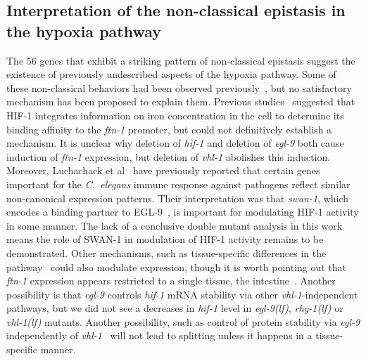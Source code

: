 \documentclass[9pt,twocolumn,twoside]{pnas-new}
\newcommand{\cel}{\emph{C.~elegans}}
\newcommand{\gene}[1]{\mbox{\emph{#1}}}
\newcommand{\ftna}{\gene{ftn-1}}
\newcommand{\egl}{\gene{egl-9(lf)}}
\newcommand{\rhy}{\gene{rhy-1(lf)}}
\newcommand{\vhl}{\gene{vhl-1(lf)}}
\newcommand{\eglp}{EGL-9}
\newcommand{\hifp}{HIF-1}
\newcommand{\hifohtargets}{56}
\begin{document}
\subsection*{Interpretation of the non-classical epistasis in the hypoxia pathway}
The \hifohtargets{} genes that exhibit a striking pattern of
non-classical epistasis suggest the existence of previously undescribed aspects
of the hypoxia pathway. Some of these non-classical behaviors had been observed
previously~\cite{Ackerman2012,Romney2011,Luhachack2012}, but no satisfactory
mechanism has been proposed to explain them. Previous
studies~\cite{Romney2011,Ackerman2012} suggested that \hifp{} integrates
information on iron concentration in the cell to determine its binding affinity
to the \ftna{} promoter, but could not definitively establish a mechanism. It is
unclear why deletion of \gene{hif-1} and deletion of \gene{egl-9} both cause
induction of \ftna{} expression, but deletion of \gene{vhl-1} abolishes this
induction. Moreover, Luchachack et al~\cite{Luhachack2012} have previously
reported that certain genes important for the \cel{} immune response against
pathogens reflect similar non-canonical expression patterns. Their
interpretation was that \gene{swan-1}, which encodes a binding partner to
\eglp{}~\cite{Shao2010}, is important for modulating \hifp{} activity in some
manner. The lack of a conclusive double mutant analysis in this work means the
role of SWAN-1 in modulation of \hifp{} activity remains to be demonstrated.
Other mechanisms, such as tissue-specific differences in the
pathway~\cite{Budde2010} could also modulate expression, though it is worth
pointing out that \ftna{} expression appears restricted to a single tissue, the
intestine~\cite{Kim2004}. Another possibility is that \gene{egl-9} controls
\gene{hif-1} mRNA stability via other \gene{vhl-1}-independent pathways, but we
did not see a decreases in \gene{hif-1} level in \egl{}, \rhy{} or \vhl{} mutants.
Another possibility, such as control of protein stability via \gene{egl-9}
independently of \gene{vhl-1}~\cite{Chintala2012} will not lead to splitting
unless it happens in a tissue-specific manner.
\end{document}
